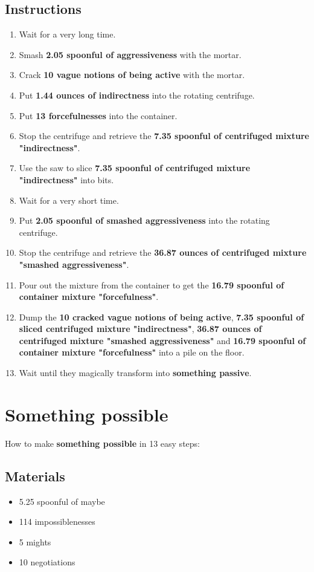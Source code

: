 \documentclass{article}
\begin{document}
\subsection{Instructions}\begin{enumerate}
\item 
Wait for a very long time.
\item 
Smash \textbf{2.05 spoonful of aggressiveness} with the mortar.
\item 
Crack \textbf{10 vague notions of being active} with the mortar.
\item 
Put \textbf{1.44 ounces of indirectness} into the rotating centrifuge.
\item 
Put \textbf{13 forcefulnesses} into the container.
\item 
Stop the centrifuge and retrieve the \textbf{7.35 spoonful of centrifuged mixture "indirectness"}.
\item 
Use the saw to slice \textbf{7.35 spoonful of centrifuged mixture "indirectness"} into bits.
\item 
Wait for a very short time.
\item 
Put \textbf{2.05 spoonful of smashed aggressiveness} into the rotating centrifuge.
\item 
Stop the centrifuge and retrieve the \textbf{36.87 ounces of centrifuged mixture "smashed aggressiveness"}.
\item 
Pour out the mixture from the container to get the \textbf{16.79 spoonful of container mixture "forcefulness"}.
\item 
Dump the \textbf{10 cracked vague notions of being active}, \textbf{7.35 spoonful of sliced centrifuged mixture "indirectness"}, \textbf{36.87 ounces of centrifuged mixture "smashed aggressiveness"} and \textbf{16.79 spoonful of container mixture "forcefulness"} into a pile on the floor.
\item 
Wait until they magically transform into \textbf{something passive}.
\end{enumerate}
\newpage
\section{Something possible}How to make \textbf{something possible} in 13 easy steps:

\subsection{Materials}\begin{itemize}
\item 
5.25 spoonful of maybe
\item 
114 impossiblenesses
\item 
5 mights
\item 
10 negotiations
\end{itemize}
\end{document}
